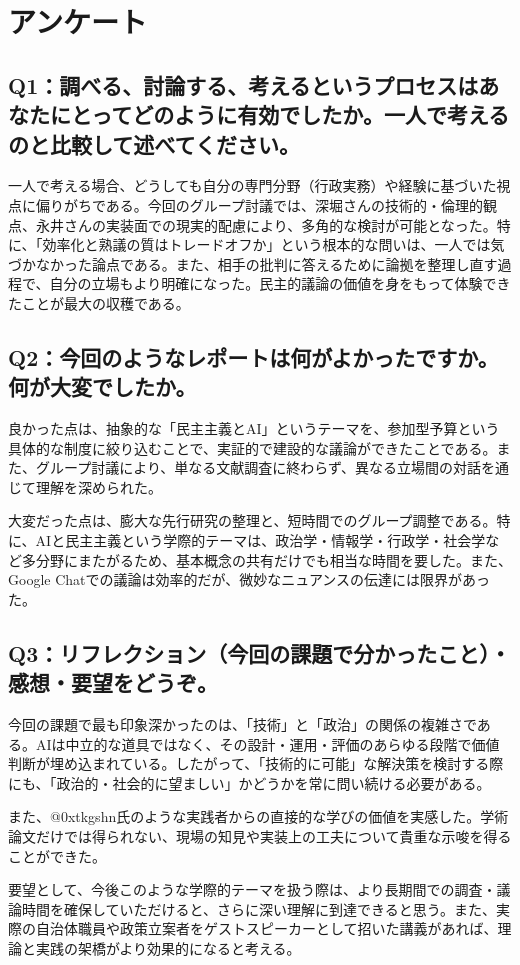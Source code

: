 \documentclass[12pt,a4j]{jarticle}
\begin{document}
\section{アンケート}

\subsection{Q1：調べる、討論する、考えるというプロセスはあなたにとってどのように有効でしたか。一人で考えるのと比較して述べてください。}

一人で考える場合、どうしても自分の専門分野（行政実務）や経験に基づいた視点に偏りがちである。今回のグループ討議では、深堀さんの技術的・倫理的観点、永井さんの実装面での現実的配慮により、多角的な検討が可能となった。特に、「効率化と熟議の質はトレードオフか」という根本的な問いは、一人では気づかなかった論点である。また、相手の批判に答えるために論拠を整理し直す過程で、自分の立場もより明確になった。民主的議論の価値を身をもって体験できたことが最大の収穫である。

\subsection{Q2：今回のようなレポートは何がよかったですか。何が大変でしたか。}

良かった点は、抽象的な「民主主義とAI」というテーマを、参加型予算という具体的な制度に絞り込むことで、実証的で建設的な議論ができたことである。また、グループ討議により、単なる文献調査に終わらず、異なる立場間の対話を通じて理解を深められた。

大変だった点は、膨大な先行研究の整理と、短時間でのグループ調整である。特に、AIと民主主義という学際的テーマは、政治学・情報学・行政学・社会学など多分野にまたがるため、基本概念の共有だけでも相当な時間を要した。また、Google Chatでの議論は効率的だが、微妙なニュアンスの伝達には限界があった。

\subsection{Q3：リフレクション（今回の課題で分かったこと）・感想・要望をどうぞ。}

今回の課題で最も印象深かったのは、「技術」と「政治」の関係の複雑さである。AIは中立的な道具ではなく、その設計・運用・評価のあらゆる段階で価値判断が埋め込まれている。したがって、「技術的に可能」な解決策を検討する際にも、「政治的・社会的に望ましい」かどうかを常に問い続ける必要がある。

また、@0xtkgshn氏のような実践者からの直接的な学びの価値を実感した。学術論文だけでは得られない、現場の知見や実装上の工夫について貴重な示唆を得ることができた。

要望として、今後このような学際的テーマを扱う際は、より長期間での調査・議論時間を確保していただけると、さらに深い理解に到達できると思う。また、実際の自治体職員や政策立案者をゲストスピーカーとして招いた講義があれば、理論と実践の架橋がより効果的になると考える。
\end{document}
